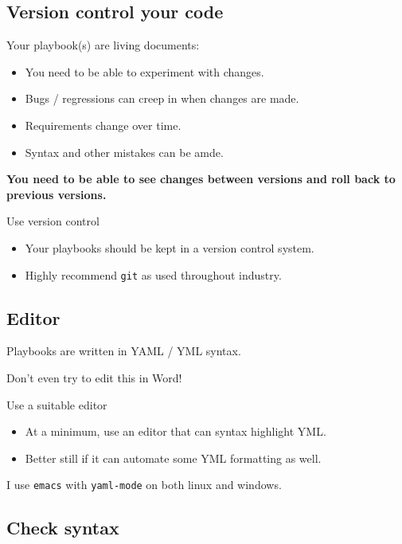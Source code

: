 \documentclass[slides]{pgnotes}
\begin{document}
\subsection{Version control your code}

Your playbook(s) are living documents:
\begin{itemize}
\item You need to be able to experiment with changes.
\item Bugs / regressions can creep in when changes are made.
\item Requirements change over time.
\item Syntax and other mistakes can be amde.
\end{itemize}

\textbf{You need to be able to see changes between versions and roll back to previous versions.}

\begin{greenbox}{Use version control}
  \begin{itemize}
  \item Your playbooks should be kept in a version control system.
  \item Highly recommend \texttt{git} as used throughout industry.
  \end{itemize}
\end{greenbox}


\subsection{Editor}

Playbooks are written in YAML / YML syntax.

Don't even try to edit this in Word!

\begin{greenbox}{Use a suitable editor}
  \begin{itemize}
  \item At a minimum, use an editor that can syntax highlight YML.
  \item Better still if it can automate some YML formatting as well.
  \end{itemize}
\end{greenbox}

I use \texttt{emacs} with \texttt{yaml-mode} on both linux and windows.


\subsection{Check syntax}
\end{document}
